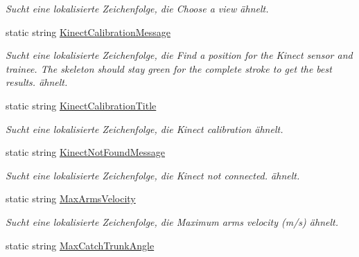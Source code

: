 \begin{DoxyCompactItemize}
\begin{DoxyCompactList}\small\item\em Sucht eine lokalisierte Zeichenfolge, die Choose a view ähnelt. \end{DoxyCompactList}\item 
static string \hyperlink{class_rowing_monitor_1_1_properties_1_1_resources_a60670c6f75fd3d65281c6341933120b4}{Kinect\+Calibration\+Message}
\begin{DoxyCompactList}\small\item\em Sucht eine lokalisierte Zeichenfolge, die Find a position for the Kinect sensor and trainee. The skeleton should stay green for the complete stroke to get the best results. ähnelt. \end{DoxyCompactList}\item 
static string \hyperlink{class_rowing_monitor_1_1_properties_1_1_resources_a609ea52354bf88d51d0cebd9bd48de8d}{Kinect\+Calibration\+Title}
\begin{DoxyCompactList}\small\item\em Sucht eine lokalisierte Zeichenfolge, die Kinect calibration ähnelt. \end{DoxyCompactList}\item 
static string \hyperlink{class_rowing_monitor_1_1_properties_1_1_resources_a33975b96d05a09f0d029609632c10ff9}{Kinect\+Not\+Found\+Message}
\begin{DoxyCompactList}\small\item\em Sucht eine lokalisierte Zeichenfolge, die Kinect not connected. ähnelt. \end{DoxyCompactList}\item 
static string \hyperlink{class_rowing_monitor_1_1_properties_1_1_resources_a24ae603ed8d743173db5ad95422f1b43}{Max\+Arms\+Velocity}
\begin{DoxyCompactList}\small\item\em Sucht eine lokalisierte Zeichenfolge, die Maximum arms velocity (m/s) ähnelt. \end{DoxyCompactList}\item 
static string \hyperlink{class_rowing_monitor_1_1_properties_1_1_resources_a719188712de0b0ca68430d55ef6e056a}{Max\+Catch\+Trunk\+Angle}

\end{DoxyCompactItemize}
